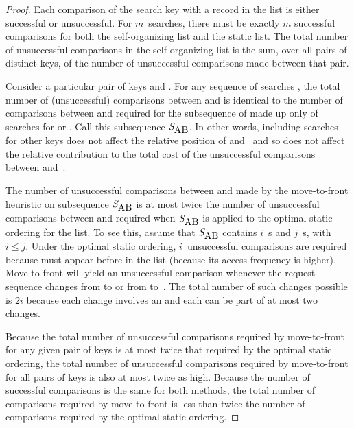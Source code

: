 \begin{proof}
Each comparison of the search key with a record in the list is either
successful or unsuccessful.
For $m$~searches, there must be exactly $m$ successful comparisons for
both the self-organizing list and the static list.
The total number of unsuccessful comparisons in the self-organizing
list is the sum, over all pairs of distinct keys, of the number of
unsuccessful comparisons made between that pair.

Consider a particular pair of keys  and .
For any sequence of searches , the total number of
(unsuccessful) comparisons between  and  is identical
to the number of comparisons between  and  required
for the subsequence of  made up only of searches for  or
.
Call this subsequence ${\textit{S}}_{\mbox{AB}}$.
In other words, including searches for other keys does not
affect the relative position of  and~ and so does not
affect the relative contribution to the total cost of the unsuccessful
comparisons between  and~.

The number of unsuccessful comparisons between  and 
made by the move-to-front heuristic on subsequence
${\textit{S}}_{\mbox{AB}}$ is at most twice the
number of unsuccessful comparisons between  and  required
when ${\textit{S}}_{\mbox{AB}}$ is applied to the optimal static
ordering for the list.
To see this, assume that ${\textit{S}}_{\mbox{AB}}$ contains
$i$~s and $j$~s, with $i \leq j$.
Under the optimal static ordering, $i$~unsuccessful comparisons are
required because  must appear before  in the list
(because its access frequency is higher).
Move-to-front will yield an unsuccessful comparison whenever the
request sequence changes from  to  or from 
to~.
The total number of such changes possible is $2i$ because each change
involves an  and each  can be part of at most two
changes.

Because the total number of unsuccessful comparisons required by
move-to-front for any given pair of keys is at most twice that
required by the optimal static ordering, the total number of
unsuccessful comparisons required by move-to-front for all pairs of
keys is also at most twice as high.
Because the number of successful comparisons is the same for both
methods, the total number of comparisons required by move-to-front is
less than twice the number of comparisons required by the optimal
static ordering.
\end{proof}


